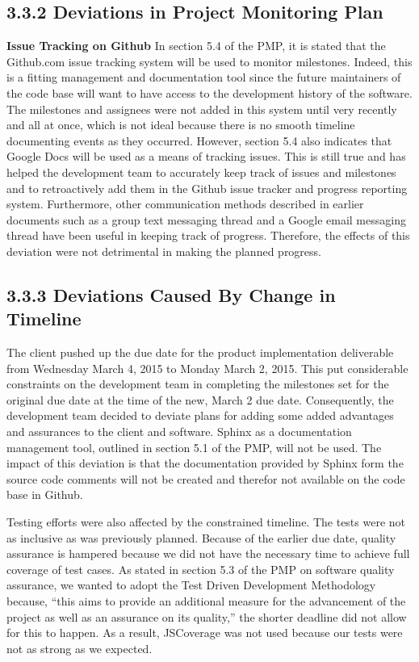 \documentclass[]{article}
\begin{document}
\subsection{3.3.2 Deviations in Project Monitoring
Plan}\label{deviations-in-project-monitoring-plan}

\textbf{Issue Tracking on Github} In section 5.4 of the PMP, it is
stated that the Github.com issue tracking system will be used to monitor
milestones. Indeed, this is a fitting management and documentation tool
since the future maintainers of the code base will want to have access
to the development history of the software. The milestones and assignees
were not added in this system until very recently and all at once, which
is not ideal because there is no smooth timeline documenting events as
they occurred. However, section 5.4 also indicates that Google Docs will
be used as a means of tracking issues. This is still true and has helped
the development team to accurately keep track of issues and milestones
and to retroactively add them in the Github issue tracker and progress
reporting system. Furthermore, other communication methods described in
earlier documents such as a group text messaging thread and a Google
email messaging thread have been useful in keeping track of progress.
Therefore, the effects of this deviation were not detrimental in making
the planned progress.

\subsection{\textbf{3.3.3 Deviations Caused By Change in
Timeline}}\label{deviations-caused-by-change-in-timeline}

The client pushed up the due date for the product implementation
deliverable from Wednesday March 4, 2015 to Monday March 2, 2015. This
put considerable constraints on the development team in completing the
milestones set for the original due date at the time of the new, March 2
due date. Consequently, the development team decided to deviate plans
for adding some added advantages and assurances to the client and
software. Sphinx as a documentation management tool, outlined in section
5.1 of the PMP, will not be used. The impact of this deviation is that
the documentation provided by Sphinx form the source code comments will
not be created and therefor not available on the code base in Github.

Testing efforts were also affected by the constrained timeline. The
tests were not as inclusive as was previously planned. Because of the
earlier due date, quality assurance is hampered because we did not have
the necessary time to achieve full coverage of test cases. As stated in
section 5.3 of the PMP on software quality assurance, we wanted to adopt
the Test Driven Development Methodology because, ``this aims to provide
an additional measure for the advancement of the project as well as an
assurance on its quality,'' the shorter deadline did not allow for this
to happen. As a result, JSCoverage was not used because our tests were
not as strong as we expected.
\end{document}
